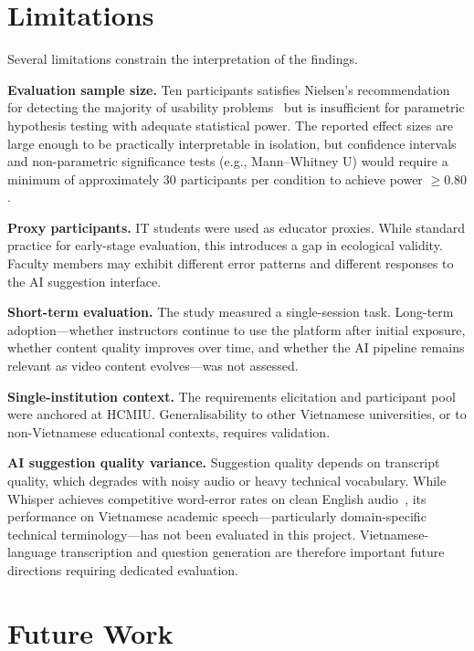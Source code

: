 \section{Limitations}

Several limitations constrain the interpretation of the findings.

\textbf{Evaluation sample size.} Ten participants satisfies Nielsen's
recommendation for detecting the majority of usability
problems~\cite{nielsen1994} but is insufficient for parametric hypothesis
testing with adequate statistical power. The reported effect sizes are large
enough to be practically interpretable in isolation, but confidence intervals
and non-parametric significance tests (e.g., Mann--Whitney U) would require
a minimum of approximately 30 participants per condition to achieve power
$\geq 0.80$.

\textbf{Proxy participants.} IT students were used as educator proxies.
While standard practice for early-stage evaluation, this introduces a gap
in ecological validity. Faculty members may exhibit different error patterns
and different responses to the AI suggestion interface.

\textbf{Short-term evaluation.} The study measured a single-session task.
Long-term adoption---whether instructors continue to use the platform after
initial exposure, whether content quality improves over time, and whether
the AI pipeline remains relevant as video content evolves---was not assessed.

\textbf{Single-institution context.} The requirements elicitation and
participant pool were anchored at HCMIU. Generalisability to other
Vietnamese universities, or to non-Vietnamese educational contexts, requires
validation.

\textbf{AI suggestion quality variance.} Suggestion quality depends on
transcript quality, which degrades with noisy audio or heavy technical
vocabulary. While Whisper achieves competitive word-error rates on clean
English audio~\cite{radford2023}, its performance on Vietnamese academic
speech---particularly domain-specific technical terminology---has not been
evaluated in this project. Vietnamese-language transcription and question
generation are therefore important future directions requiring dedicated
evaluation.

\section{Future Work}

